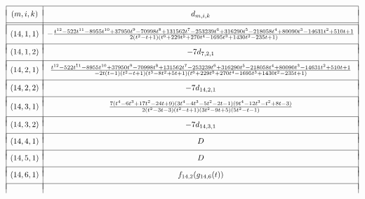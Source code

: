 \begin{table}[!ht]
\[
\begin{array}{|c|c|} 
\hline
 &  \\ [-.75 em]
(m,i ,k ) & 
\hphantom{0000000000000000000000000000000} d_{m,i, k} \hphantom{0000000000000000000000000000000}\\
 &  \\ [-.75 em]
\hline
\hline
& \\ [-.75em]
(14,1,1) & - \frac{t^{12} - 522t^{11} - 8955t^{10} + 37950t^9 - 70998t^8 + 131562t^7 - 253239t^6 + 316290t^5 - 218058t^4 + 80090t^3 - 14631t^2 + 510t + 1}{2(t^2 - t + 1)(t^6 + 229t^5 + 270t^4 - 1695t^3 + 1430t^2 - 235t + 1)} \\
& \\ [-.75em]
\hline
& \\ [-.75em]
(14,1,2) & -7 d_{7,2,1} \\
& \\ [-.75em]
\hline
& \\ [-.75em]
(14,2,1) &  \frac{t^{12} - 522t^{11} - 8955t^{10} + 37950t^9 - 70998t^8 + 131562t^7 - 253239t^6 + 316290t^5 - 218058t^4 + 80090t^3 - 14631t^2 + 510t + 1}{-2t(t-1)(t^2-t+1)(t^3-8t^2+5t+1)(t^6 + 229t^5 + 270t^4 - 1695t^3 + 1430t^2 - 235t + 1)} \\
& \\ [-.75em]
\hline
& \\ [-.75em]
(14,2,2) &  -7d_{14,2,1} \\
& \\ [-.75em]
\hline
& \\ [-.75em]
(14,3,1) & \frac{7(t^4 - 6t^3 + 17t^2 - 24t + 9)(3t^4 - 4t^3 - 5t^2 - 2t - 1)(9t^4 - 12t^3 - t^2 + 8t - 3)}{2(t^2 - 3t - 3)(t^2 - t + 1)(3t^2 - 9t + 5)(5t^2 - t - 1)} \\
& \\ [-.75em]
\hline
& \\ [-.75em]
(14,3,2) & -7d_{14,3,1} \\
& \\ [-.75em]
\hline
& \\ [-.75em]
(14,4,1) & D \\
& \\ [-.75em]
\hline
& \\ [-.75em]
(14,5,1) & D \\
& \\ [-.75em]
\hline
& \\ [-.75em]
(14,6,1) & f_{14,2}(g_{14,6}(t)) \\
& \\ [-.75em]
\hline
& \\ [-.75em]

\end{array}\]
\end{table}

